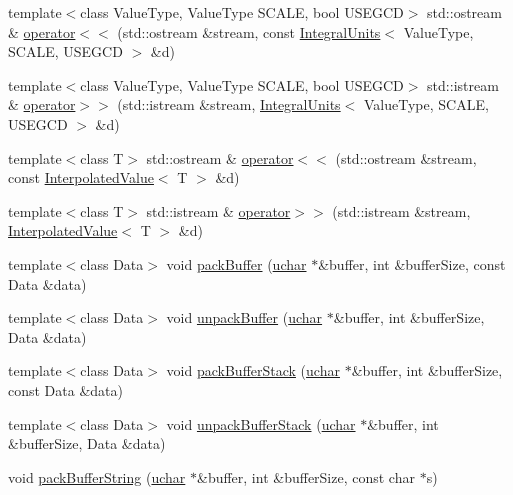 \begin{CompactItemize}
\item 
template$<$class Value\-Type, Value\-Type SCALE, bool USEGCD$>$ std::ostream \& \hyperlink{namespace_j_g_t_l_bb4eaae6cdeb0bb91835f543745cf38e}{operator$<$$<$} (std::ostream \&stream, const \hyperlink{class_j_g_t_l_1_1_integral_units}{Integral\-Units}$<$ Value\-Type, SCALE, USEGCD $>$ \&d)
\item 
template$<$class Value\-Type, Value\-Type SCALE, bool USEGCD$>$ std::istream \& \hyperlink{namespace_j_g_t_l_e2329341531898d1534dbc7ecb0b6a21}{operator$>$$>$} (std::istream \&stream, \hyperlink{class_j_g_t_l_1_1_integral_units}{Integral\-Units}$<$ Value\-Type, SCALE, USEGCD $>$ \&d)
\item 
template$<$class T$>$ std::ostream \& \hyperlink{namespace_j_g_t_l_14895317a64983a968bb8236dd6e32d5}{operator$<$$<$} (std::ostream \&stream, const \hyperlink{class_j_g_t_l_1_1_interpolated_value}{Interpolated\-Value}$<$ T $>$ \&d)
\item 
template$<$class T$>$ std::istream \& \hyperlink{namespace_j_g_t_l_40f708595d5793876f680b255589f642}{operator$>$$>$} (std::istream \&stream, \hyperlink{class_j_g_t_l_1_1_interpolated_value}{Interpolated\-Value}$<$ T $>$ \&d)
\item 
template$<$class Data$>$ void \hyperlink{namespace_j_g_t_l_b04f627a23eb9d82666a9b82385365dc}{pack\-Buffer} (\hyperlink{namespace_j_g_t_l_16d84383f2c4546df4385d012e588239}{uchar} $\ast$\&buffer, int \&buffer\-Size, const Data \&data)
\item 
template$<$class Data$>$ void \hyperlink{namespace_j_g_t_l_b9e062cddc8e923d7c30e2b79560eced}{unpack\-Buffer} (\hyperlink{namespace_j_g_t_l_16d84383f2c4546df4385d012e588239}{uchar} $\ast$\&buffer, int \&buffer\-Size, Data \&data)
\item 
template$<$class Data$>$ void \hyperlink{namespace_j_g_t_l_5a10f965c64c24619d6a7db5db42750a}{pack\-Buffer\-Stack} (\hyperlink{namespace_j_g_t_l_16d84383f2c4546df4385d012e588239}{uchar} $\ast$\&buffer, int \&buffer\-Size, const Data \&data)
\item 
template$<$class Data$>$ void \hyperlink{namespace_j_g_t_l_c6ee2959d8b1b74adf7177c3066513a0}{unpack\-Buffer\-Stack} (\hyperlink{namespace_j_g_t_l_16d84383f2c4546df4385d012e588239}{uchar} $\ast$\&buffer, int \&buffer\-Size, Data \&data)
\item 
void \hyperlink{namespace_j_g_t_l_0f1a14885672c043d37fe1c2870e5fd5}{pack\-Buffer\-String} (\hyperlink{namespace_j_g_t_l_16d84383f2c4546df4385d012e588239}{uchar} $\ast$\&buffer, int \&buffer\-Size, const char $\ast$s)

\end{CompactItemize}
